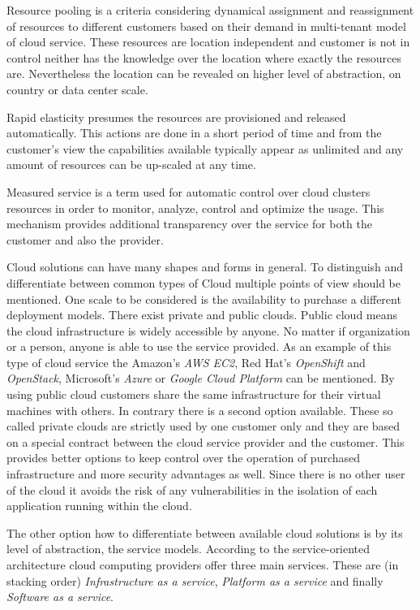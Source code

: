Resource pooling is a criteria considering dynamical assignment and reassignment of resources to different customers based on their demand in multi-tenant model of cloud service. These resources are location independent and customer is not in control neither has the knowledge over the location where exactly the resources are. Nevertheless the location can be revealed on higher level of abstraction, on country or data center scale.

Rapid elasticity presumes the resources are provisioned and released automatically. This actions are done in a short period of time and from the customer's view the capabilities available typically appear as unlimited and any amount of resources can be up-scaled at any time.

Measured service is a term used for automatic control over cloud clusters resources in order to monitor, analyze, control and optimize the usage. This mechanism provides additional transparency over the service for both the customer and also the provider.

Cloud solutions can have many shapes and forms in general. To distinguish and differentiate between common types of Cloud multiple points of view should be mentioned. One scale to be considered is the availability to purchase a different deployment models. There exist private and public clouds. Public cloud means the cloud infrastructure is widely accessible by anyone. No matter if organization or a person, anyone is able to use the service provided. As an example of this type of cloud service the Amazon's \emph{AWS EC2}, Red Hat's \emph{OpenShift} and \emph{OpenStack}, Microsoft's \emph{Azure} or \emph{Google Cloud Platform} can be mentioned. By using public cloud customers share the same infrastructure for their virtual machines with others. In contrary there is a second option available. These so called private clouds are strictly used by one customer only and they are based on a special contract between the cloud service provider and the customer. This provides better options to keep control over the operation of purchased infrastructure and more security advantages as well. Since there is no other user of the cloud it avoids the risk of any vulnerabilities in the isolation of each application running within the cloud.

The other option how to differentiate between available cloud solutions is by its level of abstraction, the service models. According to the service-oriented architecture cloud computing providers offer three main services. These are (in stacking order) \emph{Infrastructure as a service}, \emph{Platform as a service} and finally \emph{Software as a service}.

